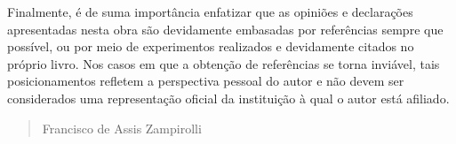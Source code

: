 Finalmente, é de suma importância enfatizar que as opiniões e declarações apresentadas nesta obra são devidamente embasadas por referências sempre que possível, ou por meio de experimentos realizados e devidamente citados no próprio livro. Nos casos em que a obtenção de referências se torna inviável, tais posicionamentos refletem a perspectiva pessoal do autor e não devem ser considerados uma representação oficial da instituição à qual o autor está afiliado.



\begin{verse}
    \vspace*{2mm}
	\begin{flushright}
		Francisco de Assis Zampirolli\\
            \date{\today}%
	\end{flushright}
\end{verse}